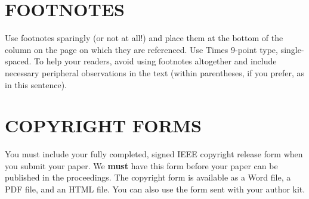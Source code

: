 \documentclass{article}
\begin{document}
\section{FOOTNOTES}
\label{sec:foot}

Use footnotes sparingly (or not at all!) and place them at the bottom of the
column on the page on which they are referenced. Use Times 9-point type,
single-spaced. To help your readers, avoid using footnotes altogether and
include necessary peripheral observations in the text (within parentheses, if
you prefer, as in this sentence).


\section{COPYRIGHT FORMS}
\label{sec:copyright}

You must include your fully completed, signed IEEE copyright release form when
you submit your paper. We {\bf must} have this form before your paper can be
published in the proceedings.  The copyright form is available as a Word file,
a PDF file, and an HTML file. You can also use the form sent with your author
kit.



\end{document}
